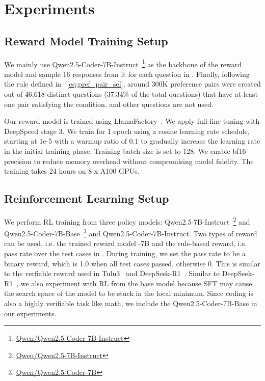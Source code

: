\section{Experiments}
\label{sec:experiments}


\subsection{Reward Model Training Setup}
We mainly use Qwen2.5-Coder-7B-Instruct~\footnote{\href{https://huggingface.co/Qwen/Qwen2.5-Coder-7B-Instruct}{Qwen/Qwen2.5-Coder-7B-Instruct}} as the backbone of the reward model and sample 16 responses from it for each question in \dataset{}. Finally, following the rule defined in ~\autoref{eq:pref_pair_sel}, around 300K preference pairs were created out of 46,618 distinct questions (37.34\% of the total questions) that have at least one pair satisfying the condition, and other questions are not used.


Our reward model is trained using LlamaFactory~\citep{zheng2024llamafactory}. We apply full fine-tuning with DeepSpeed stage 3. We train for 1 epoch using a cosine learning rate schedule, starting at 1e-5 with a warmup ratio of 0.1 to gradually increase the learning rate in the initial training phase. Training batch size is set to 128. We enable bf16 precision to reduce memory overhead without compromising model fidelity. The training takes 24 hours on 8 x A100 GPUs.

\subsection{Reinforcement Learning Setup}

We perform RL training from three policy models: Qwen2.5-7B-Instruct~\footnote{\href{https://huggingface.co/Qwen/Qwen2.5-7B-Instruct}{Qwen/Qwen2.5-7B-Instruct}} and Qwen2.5-Coder-7B-Base~\footnote{\href{https://huggingface.co/Qwen/Qwen2.5-Coder-7B}{Qwen/Qwen2.5-Coder-7B}} and Qwen2.5-Coder-7B-Instruct. Two types of reward can be used, i.e. the trained reward model \RM-7B and the rule-based reward, i.e. pass rate over the test cases in \dataset{}. During training, we set the pass rate to be a binary reward, which is 1.0 when all test cases passed, otherwise 0. This is similar to the verfiable reward used in Tulu3~\citep{tulu3} and DeepSeek-R1~\citep{DeepseekR1}. Similar to DeepSeek-R1~\citep{DeepseekR1}, we also experiment with RL from the base model because SFT may cause the search space of the model to be stuck in the local minimum. Since coding is also a highly verifiable task like math, we include the Qwen2.5-Coder-7B-Base in our experiments.

